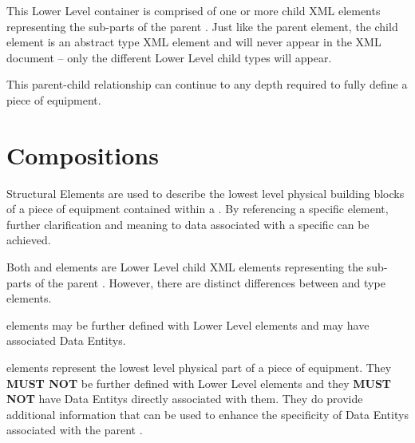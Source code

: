 This \gls{Lower Level}  container is comprised of one or more child  \gls{XML} elements representing the sub-parts of the parent . Just like the parent  element, the child  element is an abstract type \gls{XML} element and will never appear in the \gls{XML} document – only the different \gls{Lower Level} child  types will appear.

This parent-child relationship can continue to any depth required to fully define a piece of equipment.







\section{Compositions}
\label{sec:Compositions}

 \glspl{Structural Element} are used to describe the lowest level physical building blocks of a piece of equipment contained within a . By referencing a specific  element, further clarification and meaning to data associated with a specific  can be achieved.

Both  and  elements are \gls{Lower Level} child  \gls{XML} elements representing the sub-parts of the parent .  However, there are distinct differences between  and  type elements.

 elements may be further defined with \gls{Lower Level}  elements and may have associated \glspl{Data Entity}.

 elements represent the lowest level physical part of a piece of equipment.  They \textbf{MUST NOT} be further defined with \gls{Lower Level}  elements and they \textbf{MUST NOT} have \glspl{Data Entity} directly associated with them.   They do provide additional information that can be used to enhance the specificity of \glspl{Data Entity} associated with the parent .





